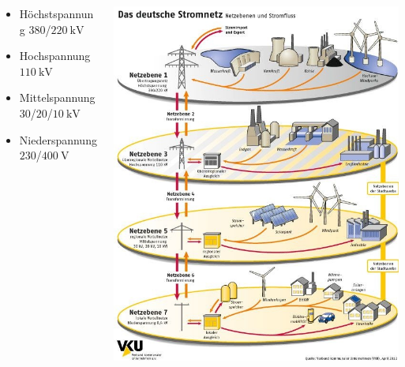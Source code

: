 \documentclass[aspectratio=1610, professionalfonts, 9pt]{beamer}
\begin{document}
{
\begin{frame}
  \begin{columns}
  \begin{column}{0.5\textwidth}
\begin{itemize}
  \item Höchstspannung $\num{380}$/$\SI{220}{\kilo\volt}$
  \item Hochspannung  $\SI{110}{\kilo\volt}$
  \item Mittelspannung  $\num{30}$/$\num{20}$/$\SI{10}{\kilo\volt}$
  \item Niederspannung $\num{230}$/$\SI{400}{\volt}$
\end{itemize}
\end{column}
\begin{column}{0.5\textwidth}
\includegraphics[width=1\textwidth]{images/netzebenen.jpg}
\end{column}
\end{columns}
\end{frame}


}
\end{document}

